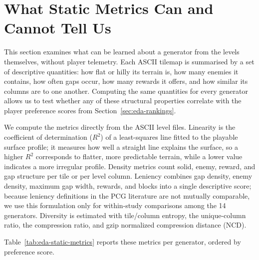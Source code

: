 \documentclass[shortabstract, mgr, english]{iithesis}
\begin{document}
\section{What Static Metrics Can and Cannot Tell Us}
\label{sec:eda-static-expressive-range}

This section examines what can be learned about a generator from
the levels themselves, without player telemetry. Each ASCII tilemap is summarised by a set of descriptive quantities: how flat or hilly its terrain is, how
many enemies it contains, how often gaps occur, how many rewards it offers,
and how similar its columns are to one another. Computing the same
quantities for every generator allows us to test whether any of these structural properties correlate with the player
preference scores from Section~\ref{sec:eda-rankings}.

We compute the metrics directly from the ASCII level files. Linearity is the
coefficient of determination ($R^2$) of a least-squares line fitted to the
playable surface profile; it measures how well a straight line explains the
surface, so a higher $R^2$ corresponds to flatter, more predictable terrain, while a lower value indicates a more irregular
profile. Density metrics count solid,
enemy, reward, and gap structure per tile or per level column. Leniency
combines gap density, enemy density, maximum gap width, rewards, and blocks
into a single descriptive score; because leniency definitions in
the PCG literature are not mutually comparable, we use this formulation only for within-study comparisons among the 14 generators. Diversity is estimated with tile/column entropy, the unique-column
ratio, the compression ratio, and gzip normalized compression distance (NCD).

Table~\ref{tab:eda-static-metrics} reports these metrics per
generator, ordered by preference score.
\end{document}
